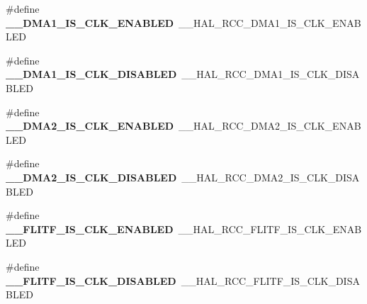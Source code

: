 \begin{DoxyCompactItemize}
\item 
\#define {\bfseries \+\_\+\+\_\+\+D\+M\+A1\+\_\+\+I\+S\+\_\+\+C\+L\+K\+\_\+\+E\+N\+A\+B\+L\+ED}~\+\_\+\+\_\+\+H\+A\+L\+\_\+\+R\+C\+C\+\_\+\+D\+M\+A1\+\_\+\+I\+S\+\_\+\+C\+L\+K\+\_\+\+E\+N\+A\+B\+L\+ED\hypertarget{group___h_a_l___r_c_c___aliased_gab8af7da04e61260adcd91c8337e6a0b1}{}\label{group___h_a_l___r_c_c___aliased_gab8af7da04e61260adcd91c8337e6a0b1}

\item 
\#define {\bfseries \+\_\+\+\_\+\+D\+M\+A1\+\_\+\+I\+S\+\_\+\+C\+L\+K\+\_\+\+D\+I\+S\+A\+B\+L\+ED}~\+\_\+\+\_\+\+H\+A\+L\+\_\+\+R\+C\+C\+\_\+\+D\+M\+A1\+\_\+\+I\+S\+\_\+\+C\+L\+K\+\_\+\+D\+I\+S\+A\+B\+L\+ED\hypertarget{group___h_a_l___r_c_c___aliased_ga8f56d12b7d9fe3f69bed24d627a12aef}{}\label{group___h_a_l___r_c_c___aliased_ga8f56d12b7d9fe3f69bed24d627a12aef}

\item 
\#define {\bfseries \+\_\+\+\_\+\+D\+M\+A2\+\_\+\+I\+S\+\_\+\+C\+L\+K\+\_\+\+E\+N\+A\+B\+L\+ED}~\+\_\+\+\_\+\+H\+A\+L\+\_\+\+R\+C\+C\+\_\+\+D\+M\+A2\+\_\+\+I\+S\+\_\+\+C\+L\+K\+\_\+\+E\+N\+A\+B\+L\+ED\hypertarget{group___h_a_l___r_c_c___aliased_gacca89b6e7c7ee7e75d4b296c7f414d7d}{}\label{group___h_a_l___r_c_c___aliased_gacca89b6e7c7ee7e75d4b296c7f414d7d}

\item 
\#define {\bfseries \+\_\+\+\_\+\+D\+M\+A2\+\_\+\+I\+S\+\_\+\+C\+L\+K\+\_\+\+D\+I\+S\+A\+B\+L\+ED}~\+\_\+\+\_\+\+H\+A\+L\+\_\+\+R\+C\+C\+\_\+\+D\+M\+A2\+\_\+\+I\+S\+\_\+\+C\+L\+K\+\_\+\+D\+I\+S\+A\+B\+L\+ED\hypertarget{group___h_a_l___r_c_c___aliased_ga5343915fc6c9e81fe74c806bac95dc9c}{}\label{group___h_a_l___r_c_c___aliased_ga5343915fc6c9e81fe74c806bac95dc9c}

\item 
\#define {\bfseries \+\_\+\+\_\+\+F\+L\+I\+T\+F\+\_\+\+I\+S\+\_\+\+C\+L\+K\+\_\+\+E\+N\+A\+B\+L\+ED}~\+\_\+\+\_\+\+H\+A\+L\+\_\+\+R\+C\+C\+\_\+\+F\+L\+I\+T\+F\+\_\+\+I\+S\+\_\+\+C\+L\+K\+\_\+\+E\+N\+A\+B\+L\+ED\hypertarget{group___h_a_l___r_c_c___aliased_gaecf13d120c8b030d3b71ad688fd79518}{}\label{group___h_a_l___r_c_c___aliased_gaecf13d120c8b030d3b71ad688fd79518}

\item 
\#define {\bfseries \+\_\+\+\_\+\+F\+L\+I\+T\+F\+\_\+\+I\+S\+\_\+\+C\+L\+K\+\_\+\+D\+I\+S\+A\+B\+L\+ED}~\+\_\+\+\_\+\+H\+A\+L\+\_\+\+R\+C\+C\+\_\+\+F\+L\+I\+T\+F\+\_\+\+I\+S\+\_\+\+C\+L\+K\+\_\+\+D\+I\+S\+A\+B\+L\+ED\hypertarget{group___h_a_l___r_c_c___aliased_ga2421872586051f72784338c03da58492}{}\label{group___h_a_l___r_c_c___aliased_ga2421872586051f72784338c03da58492}


\end{DoxyCompactItemize}
